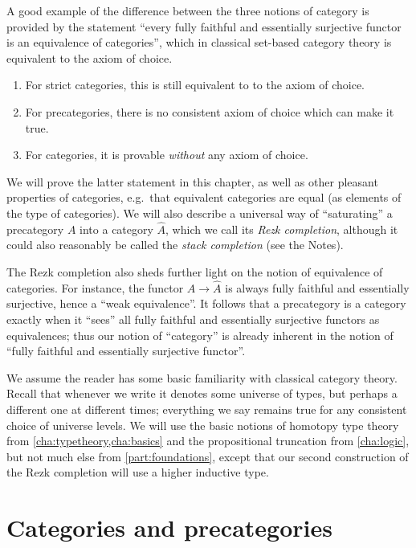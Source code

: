 A good example of the difference between the three notions of category is provided by the statement ``every fully faithful and essentially surjective functor is an equivalence of categories'', which in classical set-based category theory is equivalent to the axiom of choice.
\begin{enumerate}
\item For strict categories, this is still equivalent to to the axiom of choice.
\item For precategories, there is no consistent axiom of choice which can make it true.
\item For categories, it is provable \emph{without} any axiom of choice.
\end{enumerate}
We will prove the latter statement in this chapter, as well as other pleasant properties of categories, e.g.\ that equivalent categories are equal (as elements of the type of categories).
We will also describe a universal way of ``saturating'' a precategory $A$ into a category $\widehat A$, which we call its \emph{Rezk completion}, although it could also reasonably be called the \emph{stack completion} (see the Notes).

The Rezk completion also sheds further light on the notion of equivalence of categories.
For instance, the functor $A \to \widehat{A}$ is always fully faithful and essentially surjective, hence a ``weak equivalence''.
It follows that a precategory is a category exactly when it ``sees'' all fully faithful and essentially surjective functors as equivalences; thus our notion of ``category'' is already inherent in the notion of ``fully faithful and essentially surjective functor''.

We assume the reader has some basic familiarity with classical category theory.
Recall that whenever we write \type it denotes some universe of types, but perhaps a different one at different times; everything we say remains true for any consistent choice of universe levels.
We will use the basic notions of homotopy type theory from \autoref{cha:typetheory,cha:basics} and the propositional truncation from \autoref{cha:logic}, but not much else from \autoref{part:foundations}, except that our second construction of the Rezk completion will use a higher inductive type.


\section{Categories and precategories}
\label{sec:cats}

